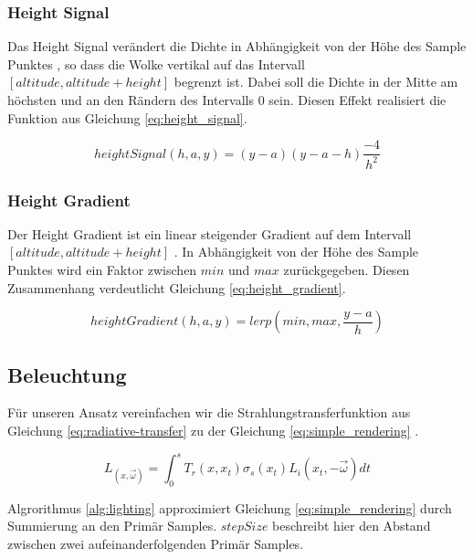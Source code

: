 \subsubsection{Height Signal}
Das Height Signal verändert die Dichte in Abhängigkeit von der Höhe des Sample Punktes \cite{Högfeldt16}, so dass die Wolke vertikal auf das Intervall $ [altitude, altitude + height] $ begrenzt ist. Dabei soll die Dichte in der Mitte am höchsten und an den Rändern des Intervalls $ 0 $ sein. Diesen Effekt realisiert die Funktion aus Gleichung \ref{eq:height_signal}.

\begin{equation}
\label{eq:height_signal}
    heightSignal(h, a, y) = (y - a) (y - a - h) \frac{-4}{h^2}
\end{equation}

\subsubsection{Height Gradient}
Der Height Gradient ist ein linear steigender Gradient auf dem Intervall $ [altitude, altitude + height] $ \cite{Högfeldt16}. In Abhängigkeit von der Höhe des Sample Punktes wird ein Faktor zwischen $ min $ und $ max $ zurückgegeben. Diesen Zusammenhang verdeutlicht Gleichung \ref{eq:height_gradient}.

\begin{equation}
\label{eq:height_gradient}
    heightGradient(h, a, y) = lerp(min, max, \frac{y - a}{h})
\end{equation}

\subsection{Beleuchtung}
Für unseren Ansatz vereinfachen wir die Strahlungstransferfunktion aus Gleichung \ref{eq:radiative-transfer} zu der Gleichung \ref{eq:simple_rendering} \cite{Högfeldt16}.

\begin{equation}
\label{eq:simple_rendering}
    L_(x, \vec{\omega}) = \int_{0}^{s} T_r(x, x_t) \sigma_s(x_t) L_i(x_t, -\vec{\omega}) dt
\end{equation}

Algrorithmus \ref{alg:lighting} approximiert Gleichung \ref{eq:simple_rendering} durch Summierung an den Primär Samples. $ stepSize $ beschreibt hier den Abstand zwischen zwei aufeinanderfolgenden Primär Samples.

